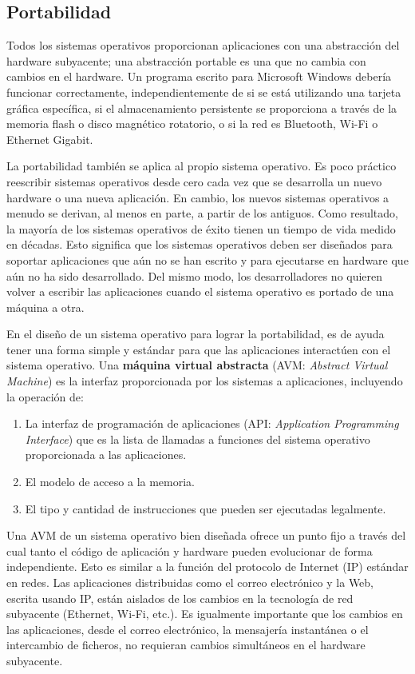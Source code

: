 \documentclass[10pt]{book}
\begin{document}
\subsection{Portabilidad}
Todos los sistemas operativos proporcionan aplicaciones con una abstracción del hardware subyacente; una abstracción portable es una que no cambia con cambios en el hardware. Un programa escrito para Microsoft Windows debería funcionar correctamente, independientemente de si se está utilizando una tarjeta gráfica específica, si el almacenamiento persistente se proporciona a través de la memoria flash o disco magnético rotatorio, o si la red es Bluetooth, Wi-Fi o Ethernet Gigabit.

La portabilidad también se aplica al propio sistema operativo. Es poco práctico reescribir sistemas operativos desde cero cada vez que se desarrolla un nuevo hardware o una nueva aplicación. En cambio, los nuevos sistemas operativos a menudo se derivan, al menos en parte, a partir de los antiguos. Como resultado, la mayoría de los sistemas operativos de éxito tienen un tiempo de vida medido en décadas. Esto significa que los sistemas operativos deben ser diseñados para soportar aplicaciones que aún no se han escrito y para ejecutarse en hardware que aún no ha sido desarrollado. Del mismo modo, los desarrolladores no quieren volver a escribir las aplicaciones cuando el sistema operativo es portado de una máquina a otra.

En el diseño de un sistema operativo para lograr la portabilidad, es de ayuda tener una forma simple y estándar para que  las aplicaciones interactúen con el sistema operativo. Una \textbf{máquina virtual abstracta} (AVM: \textit{Abstract Virtual Machine}) es la interfaz proporcionada por los sistemas a aplicaciones, incluyendo la operación de:
\begin{enumerate}
\item La interfaz de programación de aplicaciones (API: \textit{Application Programming Interface}) que es la lista de llamadas a funciones del sistema operativo proporcionada a las aplicaciones.
\item El modelo de acceso a la memoria.
\item El tipo y cantidad de instrucciones que pueden ser ejecutadas legalmente.
\end{enumerate}

Una AVM de un sistema operativo bien diseñada ofrece un punto fijo a través del cual tanto el código de aplicación y hardware pueden evolucionar de forma independiente. Esto es similar a la función del protocolo de Internet (IP) estándar en redes. Las aplicaciones distribuidas como el correo electrónico y la Web, escrita usando IP, están aislados de los cambios en la tecnología de red subyacente (Ethernet, Wi-Fi, etc.). Es igualmente importante que los cambios en las aplicaciones, desde el correo electrónico, la mensajería instantánea o el intercambio de ficheros, no requieran cambios simultáneos en el hardware subyacente.
\end{document}
